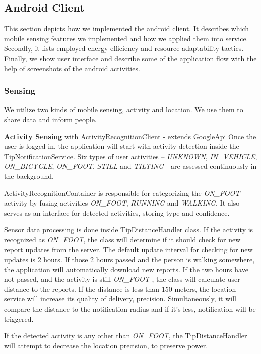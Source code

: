 \subsection{Android Client}
This section depicts how we implemented the android client. It describes which mobile sensing features we implemented and how we applied them into service. Secondly, it lists employed energy efficiency and resource adaptability tactics. Finally, we show user interface and describe some of the application flow with the help of screenshots of the android activities.

\subsubsection{Sensing}
We utilize two kinds of mobile sensing, activity and location. We use them to share data and inform people.

\textbf{Activity Sensing} with ActivityRecognitionClient  - extends GoogleApi
Once the user is logged in, the application will start with activity detection inside the TipNotificationService. Six types of user activities – \textit{UNKNOWN}, \textit{IN\_VEHICLE}, \textit{ON\_BICYCLE}, \textit{ON\_FOOT}, \textit{STILL} and \textit{TILTING} - are assessed continuously in the background.

ActivityRecognitionContainer is responsible for categorizing the \textit{ON\_FOOT} activity by fusing activities \textit{ON\_FOOT}, \textit{RUNNING} and \textit{WALKING}. It also serves as an interface for detected activities, storing type and confidence.

Sensor data processing is done inside TipDistanceHandler class.  If the activity is recognized as \textit{ON\_FOOT}, the class will determine if it should check for new report updates from the server. The default update interval for checking for new updates is 2 hours. If those 2 hours passed and the person is walking somewhere, the application will automatically download new reports. If the two hours have not passed, and the activity is still \textit{ON\_FOOT} , the class will calculate user distance to the reports. If the distance is less than 150 meters, the location service will increase its quality of delivery, precision. Simultaneously, it will compare the distance to the notification radius and if it’s less, notification will be triggered.

If the detected activity is any other than \textit{ON\_FOOT}, the TipDistanceHandler will attempt to decrease the location precision, to preserve power.
~\\

